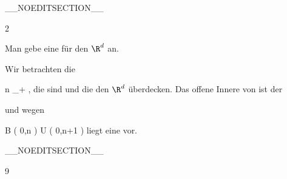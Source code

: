 __NOEDITSECTION__

{2}

{

Man gebe eine
für den $\R^d$ an.

}
{

Wir betrachten die

 {}
 {n \in \N_+} {}
 {} {} {} {,}
die
sind und die den $\R^d$ überdecken. Das offene Innere von
ist der

 und wegen

\mavergleichskettedisp
{\vergleichskette
{ B  \left(  0,n \right)
}
{ \subseteq} { U \left(   0,n+1  \right)
}
{ } {
}
{ } {
}
{ } {
}
}
{}{}{}
liegt eine
vor.

 }

__NOEDITSECTION__

{9}

